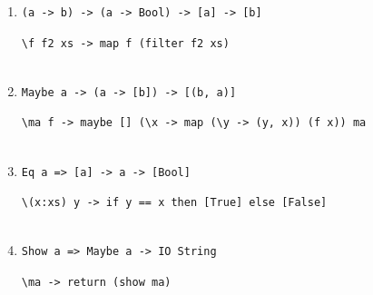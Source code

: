 \documentclass[11pt]{article}
\begin{document}
\begin{enumerate}
\begin{minipage}[t]{\linewidth}
\begin{lstlisting}[style=answer]
\end{lstlisting}
\end{minipage}

\item
\begin{minipage}[t]{\linewidth}
\vspace{-\baselineskip}
\begin{lstlisting}
(a -> b) -> (a -> Bool) -> [a] -> [b]
\end{lstlisting}
\begin{lstlisting}[style=answer]
\f f2 xs -> map f (filter f2 xs)


\end{lstlisting}
\end{minipage}

\item
\begin{minipage}[t]{\linewidth}
\vspace{-\baselineskip}
\begin{lstlisting}
Maybe a -> (a -> [b]) -> [(b, a)]
\end{lstlisting}
\begin{lstlisting}[style=answer]
\ma f -> maybe [] (\x -> map (\y -> (y, x)) (f x)) ma


\end{lstlisting}
\end{minipage}

\item
\begin{minipage}[t]{\linewidth}
\vspace{-\baselineskip}
\begin{lstlisting}
Eq a => [a] -> a -> [Bool]
\end{lstlisting}
\begin{lstlisting}[style=answer]
\(x:xs) y -> if y == x then [True] else [False]


\end{lstlisting}
\end{minipage}

\item
\begin{minipage}[t]{\linewidth}
\vspace{-\baselineskip}
\begin{lstlisting}
Show a => Maybe a -> IO String
\end{lstlisting}
\begin{lstlisting}[style=answer]
\ma -> return (show ma)



\end{lstlisting}
\end{minipage}


\end{enumerate}
\end{document}
